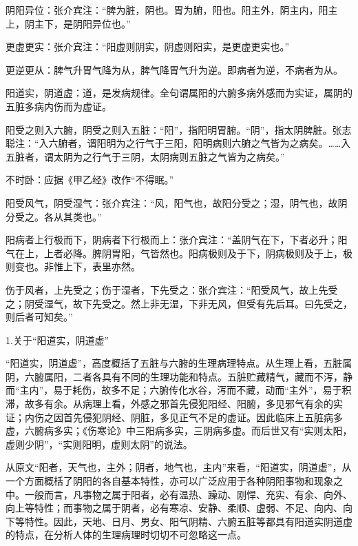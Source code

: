 \documentclass[12pt]{ctexbook}
\begin{document}

\begin{jiaozhu}
  \item 阴阳异位：张介宾注：“脾为脏，阴也。胃为腑，阳也。阳主外，阴主内，阳主上，阴主下，是阴阳异位也。”
  \item 更虚更实：张介宾注：“阳虚则阴实，阴虚则阳实，是更虚更实也。”
  \item 更逆更从：脾气升胃气降为从，脾气降胃气升为逆。即病者为逆，不病者为从。
  \item 阳道实，阴道虚：道，是发病规律。全句谓属阳的六腑多病外感而为实证，属阴的五脏多病内伤而为虚证。
  \item 阳受之则入六腑，阴受之则入五脏：“阳”，指阳明胃腑。“阴”，指太阴脾脏。张志聪注：“入六腑者，谓阳明为之行气于三阳，阳明病则六腑之气皆为之病矣。……入五脏者，谓太阴为之行气于三阴，太阴病则五脏之气皆为之病矣。”
  \item 不时卧：应据《甲乙经》改作“不得眠。”
  \item 阳受风气，阴受湿气：张介宾注：“风，阳气也，故阳分受之；湿，阴气也，故阴分受之。各从其类也。”
  \item 阳病者上行极而下，阴病者下行极而上：张介宾注：“盖阴气在下，下者必升；阳气在上，上者必降。脾阴胃阳，气皆然也。阳病极则及于下，阴病极则及于上，极则变也。非惟上下，表里亦然。
  \item 伤于风者，上先受之；伤于湿者，下先受之：张介宾注：“阳受风气，故上先受之；阴受湿气，故下先受之。然上非无湿，下非无风，但受有先后耳。曰先受之，则后者可知矣。”
\end{jiaozhu}


1.关于“阳道实，阴道虚”

“阳道实，阴道虚”，高度概括了五脏与六腑的生理病理特点。从生理上看，五脏属阴，六腑属阳，二者各具有不同的生理功能和特点。五脏贮藏精气，藏而不泻，静而“主内”，易于耗伤，故多不足；六腑传化水谷，泻而不藏，动而“主外”，易于积滞，故多有余。从病理上看，外感之邪首先侵犯阳经、阳腑，多见邪气有余的实证；内伤之因首先侵犯阴经、阴脏，多见正气不足的虚证。因此临床上五脏病多虚，六腑病多实；《伤寒论》中三阳病多实，三阴病多虚。而后世又有“实则太阳，虚则少阴”，“实则阳明，虚则太阴”的说法。

从原文“阳者，天气也，主外；阴者，地气也，主内”来看，“阳道实，阴道虚”，从一个方面概栝了阴阳的各自基本特性，亦可以广泛应用于各种阴阳事物和现象之中。一般而言，凡事物之属于阳者，必有温热、躁动、刚悍、充实、有余、向外、向上等特性；而事物之属于阴者，必有寒凉、安静、柔顺、虚弱、不足、向内、向下等特性。因此，天地、日月、男女、阳气阴精、六腑五脏等都具有阳道实阴道虚的特点，在分析人体的生理病理时切切不可忽略这一点。
\end{document}

